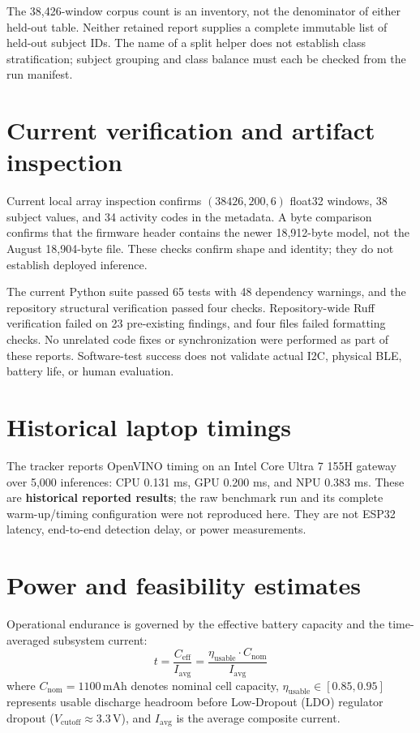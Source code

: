 The 38,426-window corpus count is an inventory, not the denominator of either held-out table. Neither retained report supplies a complete immutable list of held-out subject IDs. The name of a split helper does not establish class stratification; subject grouping and class balance must each be checked from the run manifest.

\section{Current verification and artifact inspection}
Current local array inspection confirms $(38426,200,6)$ float32 windows, 38 subject values, and 34 activity codes in the metadata. A byte comparison confirms that the firmware header contains the newer 18,912-byte model, not the August 18,904-byte file. These checks confirm shape and identity; they do not establish deployed inference.

The current Python suite passed 65 tests with 48 dependency warnings, and the repository structural verification passed four checks. Repository-wide Ruff verification failed on 23 pre-existing findings, and four files failed formatting checks. No unrelated code fixes or synchronization were performed as part of these reports. Software-test success does not validate actual I2C, physical BLE, battery life, or human evaluation.

\section{Historical laptop timings}
The tracker reports OpenVINO timing on an Intel Core Ultra 7 155H gateway over 5,000 inferences: CPU 0.131 ms, GPU 0.200 ms, and NPU 0.383 ms. These are \textbf{historical reported results}; the raw benchmark run and its complete warm-up/timing configuration were not reproduced here. They are not ESP32 latency, end-to-end detection delay, or power measurements.

\section{Power and feasibility estimates}
Operational endurance is governed by the effective battery capacity and the time-averaged subsystem current:
\begin{equation}
t = \frac{C_{\mathrm{eff}}}{I_{\mathrm{avg}}} = \frac{\eta_{\mathrm{usable}} \cdot C_{\mathrm{nom}}}{I_{\mathrm{avg}}}
\label{eq:battery_endurance}
\end{equation}
where $C_{\mathrm{nom}} = 1100\,\mathrm{mAh}$ denotes nominal cell capacity, $\eta_{\mathrm{usable}} \in [0.85, 0.95]$ represents usable discharge headroom before Low-Dropout (LDO) regulator dropout ($V_{\mathrm{cutoff}} \approx 3.3\,\mathrm{V}$), and $I_{\mathrm{avg}}$ is the average composite current.

